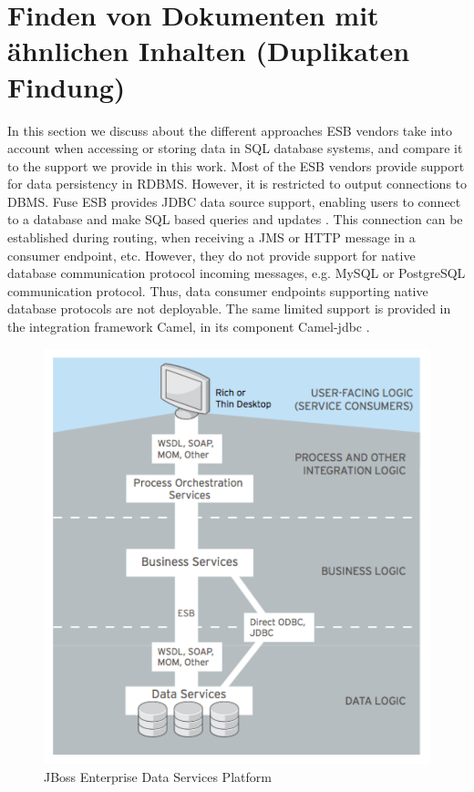 \section{Finden von Dokumenten mit ähnlichen Inhalten (Duplikaten Findung)}
\label{sec:FindenvonDokumenten}

In this section we discuss about the different approaches \ac{ESB} vendors take into account when accessing or storing data in \ac{SQL} database systems, and compare it to the support we provide in this work. 
Most of the \ac{ESB} vendors provide support for data persistency in \ac{RDBMS}. However, it is restricted to output connections to \ac{DBMS}. Fuse \ac{ESB} provides \ac{JDBC} data source support, enabling users to connect to a database and make \ac{SQL} based queries and updates \cite{FuseIntro}. This connection can be established during routing, when receiving a JMS or HTTP message in a consumer endpoint, etc. However, they do not provide support for native database communication protocol incoming messages, e.g. MySQL or PostgreSQL communication protocol. Thus, data consumer endpoints supporting native database protocols are not deployable. The same limited support is provided in the integration framework Camel, in its component Camel-jdbc \cite{cameljdbc}.

 \begin{figure}[htb]
	\centering
		\includegraphics[clip, scale=0.4]{./gfx/jbossds.pdf}
	\caption[JBoss SOA and Data Services Integration]{JBoss Enterprise Data Services Platform \cite{jboss2011}}
	\label{fig:jbossdataservice}
\end{figure}

